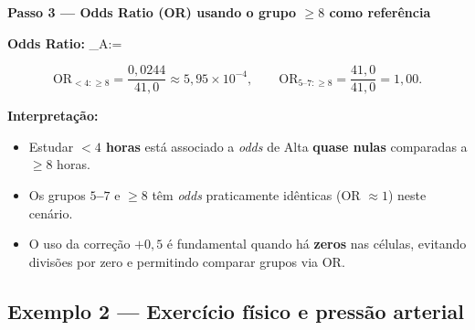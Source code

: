 \begin{SolvedBox}
\textbf{Passo 3 — Odds Ratio (OR) usando o grupo $\ge 8$ como referência}

\begin{FormulaBox}
\textbf{Odds Ratio:}\;\; _{A:}=
\end{FormulaBox}

\[
\mathrm{OR}_{<4:\ge 8}=\frac{0{,}0244}{41{,}0}\approx 5{,}95\times 10^{-4},
\qquad
\mathrm{OR}_{5\text{--}7:\ge 8}=\frac{41{,}0}{41{,}0}=1{,}00.
\]

\textbf{Interpretação:}
\begin{itemize}[leftmargin=*]
\item Estudar \textbf{$<4$ horas} está associado a \emph{odds} de Alta \textbf{quase nulas} comparadas a $\ge 8$ horas.
\item Os grupos \textbf{$5$--$7$} e \textbf{$\ge 8$} têm \emph{odds} praticamente idênticas (OR $\approx 1$) neste cenário.
\item O uso da correção $+0{,}5$ é fundamental quando há \textbf{zeros} nas células, evitando divisões por zero e permitindo comparar grupos via OR.
\end{itemize}
\end{SolvedBox}




\subsection*{Exemplo 2 — Exercício físico e pressão arterial}

